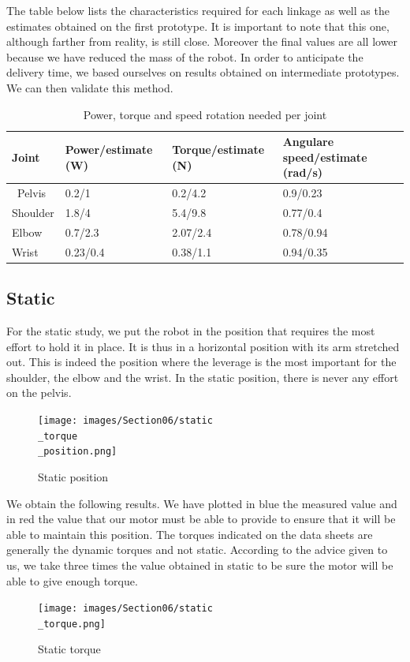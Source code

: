 \bigbreak
The table below lists the characteristics required for each linkage as well as the estimates obtained on the first prototype. It is important to note that this one, although farther from reality, is still close. Moreover the final values are all lower because we have reduced the mass of the robot. In order to anticipate the delivery time, we based ourselves on results obtained on intermediate prototypes. We can then validate this method. 

\begin{table}[ht]
    \centering
    \begin{tabular}{|p{1.5cm} | p{4cm} | p{4cm}|p{5cm} |} 
        \hline
        \textbf{Joint} & \textbf{Power/estimate (W)} & \textbf{Torque/estimate (N)}& \textbf{Angulare speed/estimate (rad/s)}\\ [0.3ex] 
        \hline\
        Pelvis & 0.2/1 & 0.2/4.2 & 0.9/0.23 \\ 
        \hline
        Shoulder & 1.8/4 & 5.4/9.8 & 0.77/0.4 \\ 
        \hline
        Elbow & 0.7/2.3 & 2.07/2.4 & 0.78/0.94 \\ 
        \hline
        Wrist & 0.23/0.4 & 0.38/1.1 & 0.94/0.35 \\ 
        \hline
    \end{tabular}
    \caption{Power, torque and speed rotation needed per joint}
\end{table}
\FloatBarrier

\subsection{Static}

For the static study, we put the robot in the position that requires the most effort to hold it in place. It is thus in a horizontal position with its arm stretched out. This is indeed the position where the leverage is the most important for the shoulder, the elbow and the wrist. In the static position, there is never any effort on the pelvis.
\begin{figure}[ht]
    \centering
    \texttt{[image: images/Section06/static\\\_torque\\\_position.png]}
    \caption{Static position}
    \label{fig:mesh15}
\end{figure}
\FloatBarrier

\bigbreak
We obtain the following results. We have plotted in blue the measured value and in red the value that our motor must be able to provide to ensure that it will be able to maintain this position. The torques indicated on the data sheets are generally the dynamic torques and not static. According to the advice given to us, we take three times the value obtained in static to be sure the motor will be able to give enough torque.
\begin{figure}[ht]
    \centering
    \texttt{[image: images/Section06/static\\\_torque.png]}
    \caption{Static torque}
    \label{fig:mesh15}
\end{figure}
\FloatBarrier

